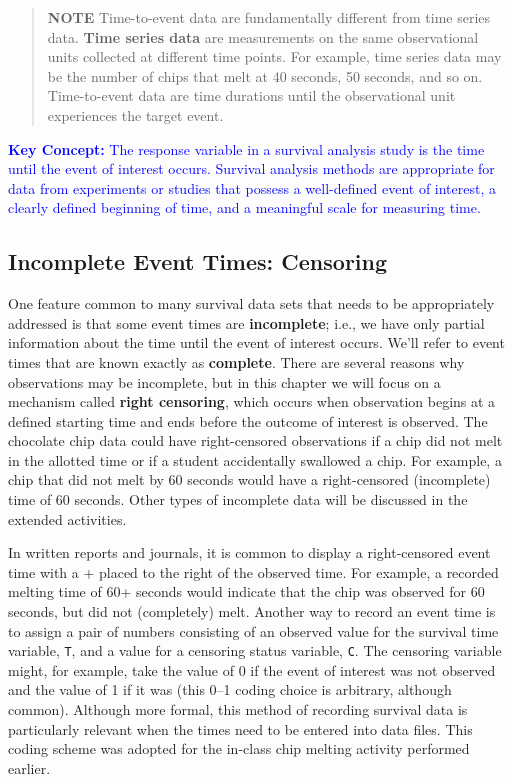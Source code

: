 \documentclass[
]{report}
\begin{document}
\begin{quote}
\textbf{NOTE}
Time-to-event data are fundamentally different from time series data. \textbf{Time series data} are measurements on the same observational units collected at different time points. For example, time series data may be the number of chips that melt at 40 seconds, 50 seconds, and so on. Time-to-event data are time durations until the observational unit experiences the target event.
\end{quote}

\textbf{\textcolor{blue}{Key Concept:}}
\textcolor{blue}{The response variable in a survival analysis study is the time until the event of interest occurs. Survival analysis methods are appropriate for data from experiments or studies that possess a well-defined event of interest, a clearly defined beginning of time, and a meaningful scale for measuring time.}

\hypertarget{incomplete-event-times-censoring}{%
\subsection*{Incomplete Event Times: Censoring}\label{incomplete-event-times-censoring}}

One feature common to many survival data sets that needs to be appropriately addressed is that some event times are \textbf{incomplete}; i.e., we have only partial information about the time until the event of interest occurs. We'll refer to event times that are known exactly as \textbf{complete}. There are several reasons why observations may be incomplete, but in this chapter we will focus on a mechanism called \textbf{right censoring}, which occurs when observation begins at a defined starting time and ends before the outcome of interest is observed. The chocolate chip data could have right-censored observations if a chip did not melt in the allotted time or if a student accidentally swallowed a chip. For example, a chip that did not melt by 60 seconds would have a right-censored (incomplete) time of 60 seconds. Other types of incomplete data will be discussed in the extended activities.

In written reports and journals, it is common to display a right-censored event time with a + placed to the right of the observed time. For example, a recorded melting time of 60+ seconds would indicate that the chip was observed for 60 seconds, but did not (completely) melt. Another way to record an event time is to assign a pair of numbers consisting of an observed value for the survival time variable, \texttt{T}, and a value for a censoring status variable, \texttt{C}. The censoring variable might, for example, take the value of 0 if the event of interest was not observed and the value of 1 if it was (this 0--1 coding choice is arbitrary, although common). Although more formal, this method of recording survival data is particularly relevant when the times need to be entered into data files. This coding scheme was adopted for the in-class chip melting activity performed earlier.
\end{document}
